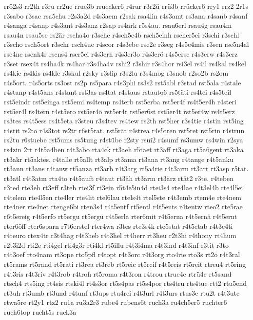 {rrö2s3
rr2th
r3ru
rr2ue
rrue3b
rruecker6
r4rur
r3r2ü
rrü3b
rrücker6
rry1
rrz2
2r1s
r3sabo
r3sac
rsa5chu
r2s3a2d
r4s3aem
r2sak
rsa4lin
r4s3amt
rs3ana
r4sanb
r4sanf
r4sanga
r4sanp
r4s3ant
r4s3anz
r2sap
rs4ark
r5s4au.
rsau6erl
rsau4g
rsau4m
rsau4n
rsau5se
rs2är
rscha4o
r3sche
r4sch5e4b
rsch5einh
rscher5ei
r3schi
r3schl
r3scho
rsch5ort
r3schr
rsch4ue
r4scor
r4s3ebe
rse2e
r3seg
r4s5e4mis
r3sen
rse5n4al
rse4ne
rsenk4r
rsens4
rser5ei
r4s3erh
r4s3er3o
r4s3erö
r4s5ersc
r4s3erw
r4s3erz
r3set
rsex4t
rs4ha4k
rs4har
r3s4ha4v
rshi2
r3shir
r3s4hor
rsi3el
rs4il
rs4kal
rs4kel
rs4kie
rs4kis
rs4kle
r3skul
r2sky
r3slip
r3s2lu
r3s4mog
r3snob
r2so2b
rs2om
r4s5ort.
r4s5orts
rs3ost
rs2p
rs5para
r4s3phi
rs3s2
rst5abl
r3stad
rst5ala
r4stale
r4stanp
r4st5ans
r4stant
rst3as
rs4tat
r4staus
rstauto6
rs5täti
rs4tei
r4s5teil
rst5eindr
rst5einga
rst5emi
rs4temp
rs4terb
rst5erba
rst5er4f
rs4t5er4h
r4steri
rst5er4l
rs4tern
r4st5ero
rst5er4ö
rst5er4r
rst5er6st
rst5er4t
rst5er4w
rs4t5erz
rs3tes
rs4t5ess
rs4t5eta
r3steu
r3s4tev
rs4tew
rs2th
rst5her
r3s4tie
r4stin
rst5ing
r4stit
rs2to
r4s3tot
rs2tr
r6st5rat.
rst5rät
r4strea
r4s5tren
rst5ret
rst5rin
r4strun
rs2tu
r6stuebe
rst5ums
rs5tung
r4stübe
r2sty
rsui2
r4sumf
rs3umw
rs4win
r2sya
rs4zin
2rt
r4t5a4ben
r4t3abo
rta4ck
rt3aeh
r5taet
rt3aff
rt3aga
rt5a6gent
rt3aka
rt3akr
rt5aktes.
r4talle
rt5allt
rt3alp
rt3ama
rt3ana
rt3ang
r4tange
r4t5anku
rt3ann
rt3ans
r4tanw
rt5anza
rt3arb
r4t3arg
rt5a4rie
r4t3arm
rt3art
rt3asp
r5tat.
rt3atl
r4t3atm
rta4to
r4t5auft
r4taut
rt3äh
rt3ärm
rt3ärz
rtät2
r3te.
r4teben
r3ted
rte3eh
rt3eff
r3teh
rtei3f
rt3ein
r5t4e5in4d
rtei3s4
rte4lae
r4t3el4b
rte4l5ei
r4telem
rte4l5en
rte4ler
rte4lit
rtel6lau
rtels4t
rtel5ste
r4t3emb
rtem4e
rte4nem
rte4ner
rte4net
rtenge6bi
rten3s4
r4t5entf
rt5entl
r4t5ents
r4tentw
rteo2
rte5rae
r6t5ereig
r4t5erfo
rt5ergu
rt5ergü
r4t5erla
rter6mit
r4t5erna
r4t5ernä
r4t5ernt
rter6öff
rter6sparn
r7t6erstel
rter4wa
r3tes
rte3s4k
rte5stat
r4t5etab
r4t3e4ti
r4teuro
rtex4tr
r3t4hag
r4t3heb
r4t3hel
rt4herr
rt3heu
r2t3hi
r4thony
rt4hum
r2t3i2d
rti2e
rti4gel
rti4g3r
rti4kl
rt5illu
r4t3i4ma
r4t3ind
r4t3inf
r3tit
r3to
r4t3oef
rto4nam
rt3ope
rto5pfl
r4topt
r4t3orc
r4t3org
rto4rie
rto3s
rt2ö
r4t3ral
rt5rams
rt5rand
rt5rati
rt3rea
rt3reb
rt5reic
rt5reif
r4t5reis
rt5reit
rtreu4
rt5ring
r4t3ris
r4t3riv
r4t3rob
r4troh
rt5roma
r4t3ron
r4trou
rtrue4c
rtrü4c
rt5sand
rtsch4
rts5ing
rt4sis
rtski4l
rt4s3or
rt5s4pas
rt5s4por
rts4tru
rts4tue
rtt2
rtu5end
rt3uh
rt3umb
rt3und
r4tunf
rt3ups
rtu4rei
r4t3url
r4t3urs
rtus3e
rtu2t
r4t3ute
rtwa5re
rt2y1
rtz2
ru1a
ru3a2r3
rube4
rubens6t
ruch3a
ru4ch5er5
ruchter6
ruch6top
rucht5s
ruck3a
}
